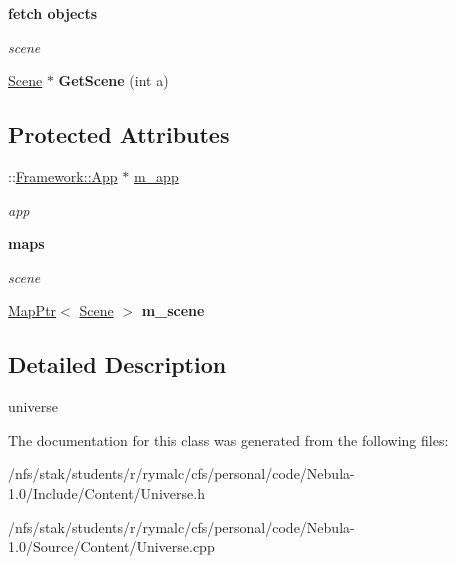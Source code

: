 \begin{Indent}{\bf fetch objects}\par
{\em \label{_amgrpb712734d7b6a37d417e36727149b52a3}
 scene }\begin{DoxyCompactItemize}
\item 
\hypertarget{classContent_1_1Universe_a67bdd32998c365e714dd1b2b8146f8b3}{
\hyperlink{classContent_1_1Scene}{Scene} $\ast$ {\bfseries GetScene} (int a)}
\label{classContent_1_1Universe_a67bdd32998c365e714dd1b2b8146f8b3}

\end{DoxyCompactItemize}
\end{Indent}
\subsection*{Protected Attributes}
\begin{DoxyCompactItemize}
\item 
\hypertarget{classContent_1_1Universe_a32bf08919f30e43fffaf8990dd4d2959}{
::\hyperlink{classFramework_1_1App}{Framework::App} $\ast$ \hyperlink{classContent_1_1Universe_a32bf08919f30e43fffaf8990dd4d2959}{m\_\-app}}
\label{classContent_1_1Universe_a32bf08919f30e43fffaf8990dd4d2959}

\begin{DoxyCompactList}\small\item\em app \item\end{DoxyCompactList}\end{DoxyCompactItemize}
\begin{Indent}{\bf maps}\par
{\em \label{_amgrp7e94476d62556cc8501e3df5b8d6470d}
 scene }\begin{DoxyCompactItemize}
\item 
\hypertarget{classContent_1_1Universe_a03764b46f74188cb9c240e8c99d7fa43}{
\hyperlink{classMapPtr}{MapPtr}$<$ \hyperlink{classContent_1_1Scene}{Scene} $>$ {\bfseries m\_\-scene}}
\label{classContent_1_1Universe_a03764b46f74188cb9c240e8c99d7fa43}

\end{DoxyCompactItemize}
\end{Indent}


\subsection{Detailed Description}
universe 

The documentation for this class was generated from the following files:\begin{DoxyCompactItemize}
\item 
/nfs/stak/students/r/rymalc/cfs/personal/code/Nebula-\/1.0/Include/Content/Universe.h\item 
/nfs/stak/students/r/rymalc/cfs/personal/code/Nebula-\/1.0/Source/Content/Universe.cpp\end{DoxyCompactItemize}
